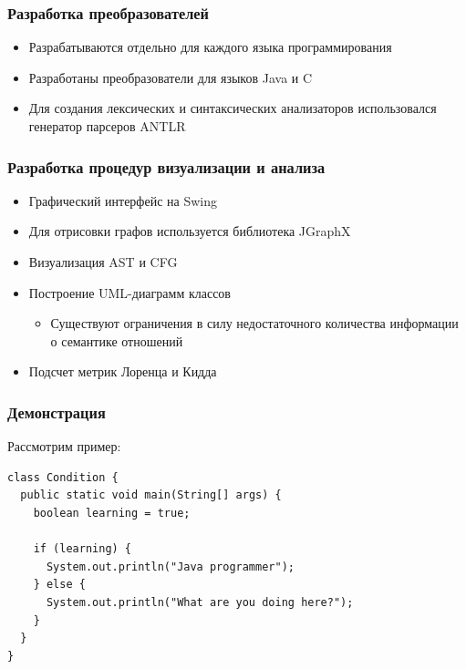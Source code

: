 \documentclass{beamer}
\begin{document}
\begin{frame}
\frametitle{Разработка преобразователей}

\begin{itemize}
    \item Разрабатываются отдельно для каждого языка программирования
    \item Разработаны преобразователи для языков Java и C
    \item Для создания лексических и синтаксических анализаторов использовался
    генератор парсеров ANTLR
\end{itemize}

\end{frame}
\begin{frame}
\frametitle{Разработка процедур визуализации и анализа}

\begin{itemize}
    \item Графический интерфейс на Swing
    \item Для отрисовки графов используется библиотека JGraphX
    \item Визуализация AST и CFG
    \item Построение UML-диаграмм классов
        \begin{itemize}
            \item Существуют ограничения в силу недостаточного количества
            информации о семантике отношений
        \end{itemize}
    \item Подсчет метрик Лоренца и Кидда
\end{itemize}

\end{frame}
\begin{frame}[fragile]
\frametitle{Демонстрация}

Рассмотрим пример:

\begin{lstlisting}
class Condition {
  public static void main(String[] args) {
    boolean learning = true;

    if (learning) {
      System.out.println("Java programmer");
    } else {
      System.out.println("What are you doing here?");
    }
  }
}
\end{lstlisting}

\end{frame}
\end{document}
